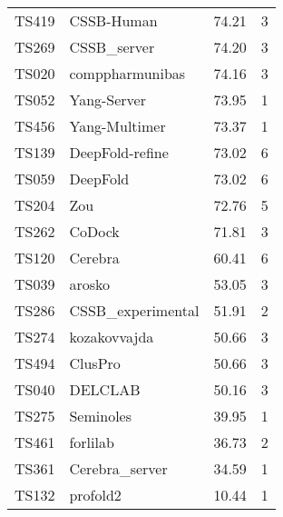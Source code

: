 \begin{table*}[ht]
\begin{minipage}[t]{0.48\textwidth}
\begin{tabular}{llrr}
TS419 & CSSB-Human & 74.21 & 3 \\ 
TS269 & CSSB\_server & 74.20 & 3 \\ 
TS020 & comppharmunibas & 74.16 & 3 \\ 
TS052 & Yang-Server & 73.95 & 1 \\ 
TS456 & Yang-Multimer & 73.37 & 1 \\ 
TS139 & DeepFold-refine & 73.02 & 6 \\ 
TS059 & DeepFold & 73.02 & 6 \\ 
TS204 & Zou & 72.76 & 5 \\ 
TS262 & CoDock & 71.81 & 3 \\ 
TS120 & Cerebra & 60.41 & 6 \\ 
TS039 & arosko & 53.05 & 3 \\ 
TS286 & CSSB\_experimental & 51.91 & 2 \\ 
TS274 & kozakovvajda & 50.66 & 3 \\ 
TS494 & ClusPro & 50.66 & 3 \\ 
TS040 & DELCLAB & 50.16 & 3 \\ 
TS275 & Seminoles & 39.95 & 1 \\ 
TS461 & forlilab & 36.73 & 2 \\ 
TS361 & Cerebra\_server & 34.59 & 1 \\ 
TS132 & profold2 & 10.44 & 1 \\ 
\bottomrule
\end{tabular}
\end{minipage}
\end{table*}
